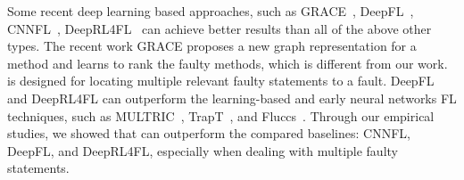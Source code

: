 Some recent deep learning based approaches, such as GRACE~\cite{lou2021boosting}, DeepFL~\cite{DeepFL}, CNNFL~\cite{zhang2019cnn}, DeepRL4FL~\cite{icse21-fl} can achieve better results than all of the above other types. The recent work GRACE proposes a new graph representation for a method and learns to rank the faulty methods, which is different from our work. {\tool} is designed for locating multiple relevant faulty statements to a fault. DeepFL and DeepRL4FL can outperform the learning-based and early neural networks FL techniques, such as MULTRIC~\cite{MULTRIC}, TrapT~\cite{TraPT}, and Fluccs~\cite{sohn2017fluccs}. Through our empirical studies, we showed that {\tool} can outperform the compared baselines: CNNFL, DeepFL, and DeepRL4FL, especially when dealing with multiple faulty statements.














\iffalse

